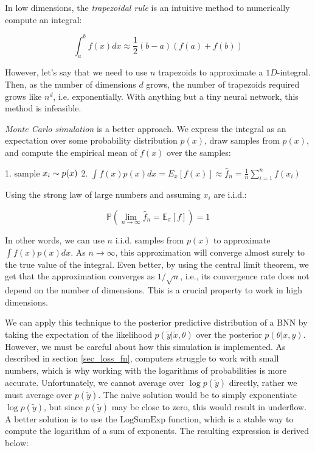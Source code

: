 \documentclass[12pt]{article}
\begin{document}
{In low dimensions, the \textit{trapezoidal rule} is an intuitive method to numerically compute an integral:

\begin{equation}
\int_{a}^{b} f(x) d x \approx \frac{1}{2}(b-a)(f(a)+f(b))
\end{equation}

However, let's say that we need to use $n$ trapezoids to approximate a $1D$-integral. Then, as the number of dimensions $d$ grows, the number of trapezoids required grows like $n^d$, i.e. exponentially. With anything but a tiny neural network, this method is infeasible.

\textit{Monte Carlo simulation} is a better approach. We express the integral as an expectation over some probability distribution $p(x)$, draw samples from $p(x)$, and compute the empirical mean of $f(x)$ over the samples:

1. sample $x_i \sim p(x)\\$
2. $\int f(x)p(x) dx = E_x[f(x)] \approx \hat{f}_n = \frac{1}{n} \sum_{i=1}^n f(x_i)$

Using the strong law of large numbers and assuming $x_i$ are i.i.d.:

\begin{equation}
\mathbb{P}\left(\lim_{n \rightarrow \infty} \hat{f}_n=\mathbb{E}_{\pi}[f]\right)=1
\end{equation}

In other words, we can use $n$ i.i.d. samples from $p(x)$ to approximate $\int f(x)p(x) dx$. As $n \rightarrow \infty$, this approximation will converge almost surely to the true value of the integral. Even better, by using the central limit theorem, we get that the approximation converges as $1/\sqrt n$, i.e., its convergence rate does not depend on the number of dimensions. This is a crucial property to work in high dimensions.


We can apply this technique to the posterior predictive distribution of a BNN by taking the expectation of the likelihood $p(\tilde{y}|\tilde{x},\theta)$ over the posterior $p(\theta|x,y)$. However, we must be careful about how this simulation is implemented. As described in section \ref{sec_loss_fn}, computers struggle to work with small numbers, which is why working with the logarithms of probabilities is more accurate. Unfortunately, we cannot average over $\log p(\tilde{y})$ directly, rather we must average over $p(\tilde{y})$. The naive solution would be to simply exponentiate $\log p(\tilde{y})$, but since $p(\tilde{y})$ may be close to zero, this would result in underflow. A better solution is to use the $\textrm{LogSumExp}$ function, which is a stable way to compute the logarithm of a sum of exponents. The resulting expression is derived below:

}
\end{document}
